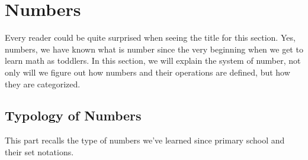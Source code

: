 \documentclass[
	12pt, %
	fleqn, %
	a4paper, %
]{LegrandOrangeBook}
\begin{document}

\section{Numbers}
Every reader could be quite surprised when seeing the title for this section. Yes, numbers, we have known what is number since the very beginning when we get to learn math as toddlers. In this section, we will explain the system of number, not only will we figure out how numbers and their operations are defined, but how they are categorized.
\subsection{Typology of Numbers}
This part recalls the type of numbers we've learned since primary school and their set notations.
\label{sec:number}
\end{document}
